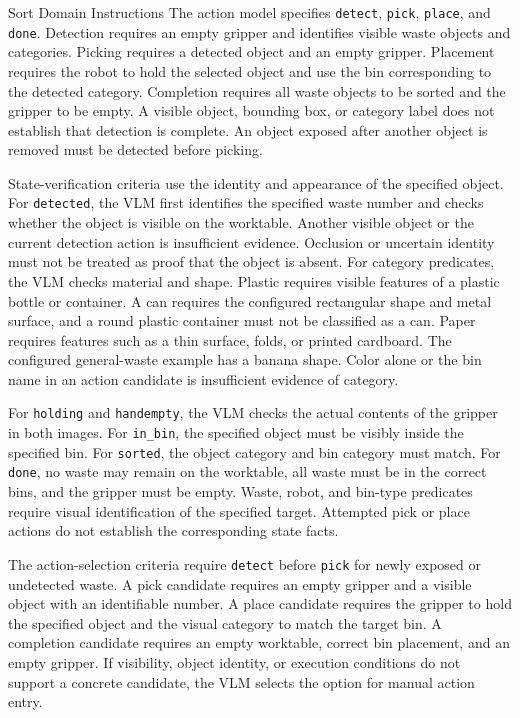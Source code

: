\begin{vlmpromptbox}{Sort Domain Instructions}
The action model specifies \texttt{detect}, \texttt{pick}, \texttt{place}, and \texttt{done}. Detection requires an empty gripper and identifies visible waste objects and categories. Picking requires a detected object and an empty gripper. Placement requires the robot to hold the selected object and use the bin corresponding to the detected category. Completion requires all waste objects to be sorted and the gripper to be empty. A visible object, bounding box, or category label does not establish that detection is complete. An object exposed after another object is removed must be detected before picking.

State-verification criteria use the identity and appearance of the specified object. For \texttt{detected}, the VLM first identifies the specified waste number and checks whether the object is visible on the worktable. Another visible object or the current detection action is insufficient evidence. Occlusion or uncertain identity must not be treated as proof that the object is absent. For category predicates, the VLM checks material and shape. Plastic requires visible features of a plastic bottle or container. A can requires the configured rectangular shape and metal surface, and a round plastic container must not be classified as a can. Paper requires features such as a thin surface, folds, or printed cardboard. The configured general-waste example has a banana shape. Color alone or the bin name in an action candidate is insufficient evidence of category.

For \texttt{holding} and \texttt{handempty}, the VLM checks the actual contents of the gripper in both images. For \texttt{in\_bin}, the specified object must be visibly inside the specified bin. For \texttt{sorted}, the object category and bin category must match. For \texttt{done}, no waste may remain on the worktable, all waste must be in the correct bins, and the gripper must be empty. Waste, robot, and bin-type predicates require visual identification of the specified target. Attempted pick or place actions do not establish the corresponding state facts.

The action-selection criteria require \texttt{detect} before \texttt{pick} for newly exposed or undetected waste. A pick candidate requires an empty gripper and a visible object with an identifiable number. A place candidate requires the gripper to hold the specified object and the visual category to match the target bin. A completion candidate requires an empty worktable, correct bin placement, and an empty gripper. If visibility, object identity, or execution conditions do not support a concrete candidate, the VLM selects the option for manual action entry.

\end{vlmpromptbox}

